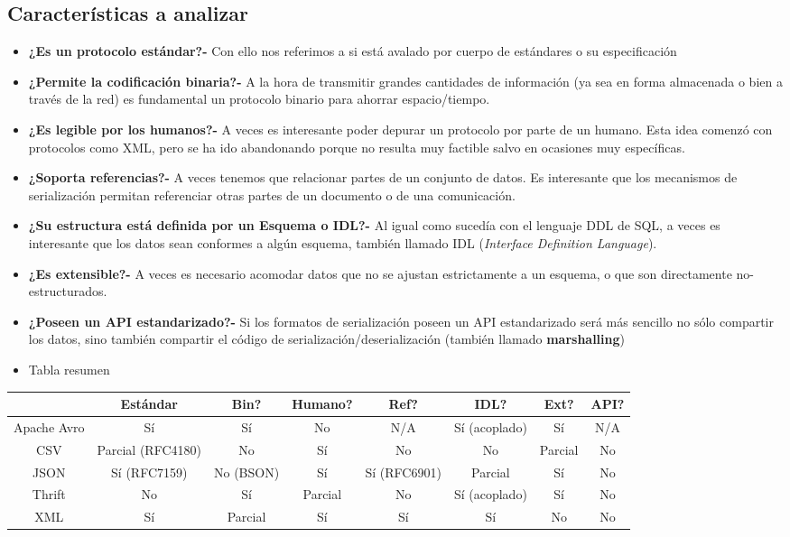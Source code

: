 \subsection{Características a analizar}
\begin{itemize}[label=\color{lightblue}\textbullet,leftmargin=*]
	\item \textbf{¿Es un protocolo estándar?-} Con ello nos referimos a si está avalado por  cuerpo de estándares o su especificación 
	\item \textbf{¿Permite la codificación binaria?-} A la hora de transmitir grandes cantidades de información (ya sea en forma almacenada o bien a través de la red) es fundamental un protocolo binario para ahorrar espacio/tiempo.
	\item \textbf{¿Es legible por los humanos?-} A veces es interesante poder depurar un protocolo por parte de un humano. Esta idea comenzó con protocolos como XML, pero se ha ido abandonando porque no resulta muy factible salvo en ocasiones muy específicas.
	\item \textbf{¿Soporta referencias?-} A veces tenemos que relacionar partes de un conjunto de datos. Es interesante que los mecanismos de serialización permitan referenciar otras partes de un documento o de una comunicación.
	\item \textbf{¿Su estructura está definida por un Esquema o IDL?-} Al igual como sucedía con el lenguaje DDL de SQL, a veces es interesante que los datos sean conformes a algún esquema, también llamado IDL (\textit{Interface Definition Language}).
	\item \textbf{¿Es extensible?-} A veces es necesario acomodar datos que no se ajustan estrictamente a un esquema, o que son directamente no-estructurados.
	\item \textbf{¿Poseen un API estandarizado?-} Si los formatos de serialización poseen un API estandarizado será más sencillo no sólo compartir los datos, sino también compartir el código de serialización/deserialización (también llamado \textbf{marshalling})
\end{itemize}
\begin{itemize}[label=\color{red}\textbullet, leftmargin=*]
	\item \color{lightblue}Tabla resumen
\end{itemize}
\begin{tabular}{cccccccc}
\hline
 & Estándar & Bin? & Humano? & Ref? & IDL? & Ext? & API? \\
\hline
Apache Avro & Sí & Sí  & No & N/A & Sí (acoplado) & Sí & N/A \\
\hline
CSV & Parcial (RFC4180) & No & Sí & No & No & Parcial  & No \\
\hline
JSON & Sí (RFC7159) & No (BSON) & Sí & Sí (RFC6901) & Parcial  & Sí & No \\
\hline
Thrift & No & Sí & Parcial  & No & Sí (acoplado) & Sí & No \\
\hline
XML & Sí & Parcial & Sí & Sí & Sí & No & No \\
\hline
\end{tabular}
